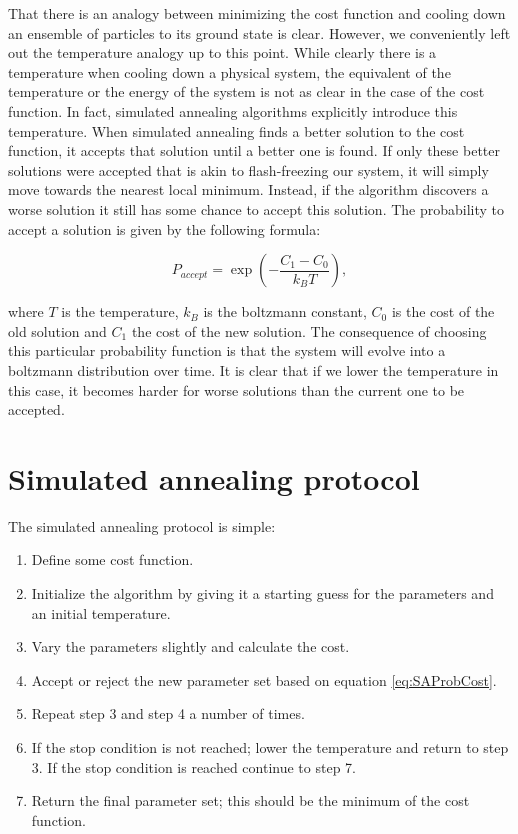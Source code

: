 That there is an analogy between minimizing the cost function and cooling down an ensemble of particles to its ground state is clear. However, we conveniently left out the temperature analogy up to this point. While clearly there is a temperature when cooling down a physical system, the equivalent of the temperature or the energy of the system is not as clear in the case of the cost function. In fact, simulated annealing algorithms explicitly introduce this temperature. When simulated annealing finds a better solution to the cost function, it accepts that solution until a better one is found. If only these better solutions were accepted that is akin to flash-freezing our system, it will simply move towards the nearest local minimum. Instead, if the algorithm discovers a worse solution it still has some chance to accept this solution. The probability to accept a solution is given by the following formula:

\begin{equation}
\label{eq:SAProbCost}
P_{accept} = \exp \left(-\frac{C_1-C_0}{k_BT}\right),
\end{equation}

where $T$ is the temperature, $k_B$ is the boltzmann constant, $C_0$ is the cost of the old solution and $C_1$ the cost of the new solution. The consequence of choosing this particular probability function is that the system will evolve into a boltzmann distribution over time. It is clear that if we lower the temperature in this case, it becomes harder for worse solutions than the current one to be accepted.


\section{Simulated annealing protocol}
\label{sec:SAProtocol}

The simulated annealing protocol is simple:

\begin{enumerate}
\item Define some cost function.
\item Initialize the algorithm by giving it a starting guess for the parameters and an initial temperature.
\item Vary the parameters slightly and calculate the cost.
\item Accept or reject the new parameter set based on equation \ref{eq:SAProbCost}.
\item Repeat step 3 and step 4 a number of times.
\item If the stop condition is not reached; lower the temperature and return to step 3. If the stop condition is reached continue to step 7.
\item Return the final parameter set; this should be the minimum of the cost function.
\end{enumerate}

